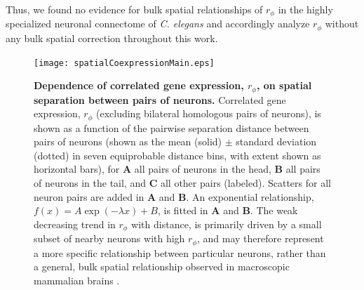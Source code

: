 \documentclass[10pt,letterpaper]{article}
\begin{document}
Thus, we found no evidence for bulk spatial relationships of $r_\phi$ in the highly specialized neuronal connectome of \emph{C. elegans} and accordingly analyze $r_\phi$ without any bulk spatial correction throughout this work.

\begin{figure}[h]
  \centering
    \texttt{[image: spatialCoexpressionMain.eps]}
  \caption{
  \textbf{Dependence of correlated gene expression, $r_\phi$, on spatial separation between pairs of neurons.}
  Correlated gene expression, $r_\phi$ (excluding bilateral homologous pairs of neurons), is shown as a function of the pairwise separation distance between pairs of neurons (shown as the mean (solid) $\pm$ standard deviation (dotted) in seven equiprobable distance bins, with extent shown as horizontal bars), for \textbf{A} all pairs of neurons in the head, \textbf{B} all pairs of neurons in the tail, and \textbf{C} all other pairs (labeled).
  Scatters for all neuron pairs are added in \textbf{A} and \textbf{B}.
  An exponential relationship, $f(x) = A\exp(-\lambda x) + B$, is fitted in \textbf{A} and \textbf{B}.
  The weak decreasing trend in $r_\phi$ with distance, is primarily driven by a small subset of nearby neurons with high $r_\phi$, and may therefore represent a more specific relationship between particular neurons, rather than a general, bulk spatial relationship observed in macroscopic mammalian brains \cite{Fulcher:2016ck, Krienen:2016eq}.
\label{fig:spatialCoexpressionMain}
  }
\end{figure}
\end{document}
